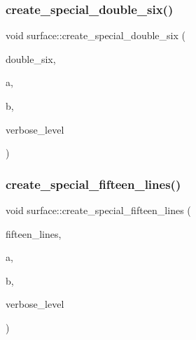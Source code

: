 \mbox{\label{classsurface_a3b0ad8a2c8ee8bebc531782c56161985}} 
\subsubsection{\texorpdfstring{create\+\_\+special\+\_\+double\+\_\+six()}{create\_special\_double\_six()}}
{\footnotesize\ttfamily void surface\+::create\+\_\+special\+\_\+double\+\_\+six (\begin{DoxyParamCaption}\item[{\mbox{\hyperlink{galois_8h_a09fddde158a3a20bd2dcadb609de11dc}{I\+NT}} $\ast$}]{double\+\_\+six,  }\item[{\mbox{\hyperlink{galois_8h_a09fddde158a3a20bd2dcadb609de11dc}{I\+NT}}}]{a,  }\item[{\mbox{\hyperlink{galois_8h_a09fddde158a3a20bd2dcadb609de11dc}{I\+NT}}}]{b,  }\item[{\mbox{\hyperlink{galois_8h_a09fddde158a3a20bd2dcadb609de11dc}{I\+NT}}}]{verbose\+\_\+level }\end{DoxyParamCaption})}

\mbox{\label{classsurface_a8017b4bd4b6558b80689021b146ae32f}} 
\subsubsection{\texorpdfstring{create\+\_\+special\+\_\+fifteen\+\_\+lines()}{create\_special\_fifteen\_lines()}}
{\footnotesize\ttfamily void surface\+::create\+\_\+special\+\_\+fifteen\+\_\+lines (\begin{DoxyParamCaption}\item[{\mbox{\hyperlink{galois_8h_a09fddde158a3a20bd2dcadb609de11dc}{I\+NT}} $\ast$}]{fifteen\+\_\+lines,  }\item[{\mbox{\hyperlink{galois_8h_a09fddde158a3a20bd2dcadb609de11dc}{I\+NT}}}]{a,  }\item[{\mbox{\hyperlink{galois_8h_a09fddde158a3a20bd2dcadb609de11dc}{I\+NT}}}]{b,  }\item[{\mbox{\hyperlink{galois_8h_a09fddde158a3a20bd2dcadb609de11dc}{I\+NT}}}]{verbose\+\_\+level }\end{DoxyParamCaption})}

